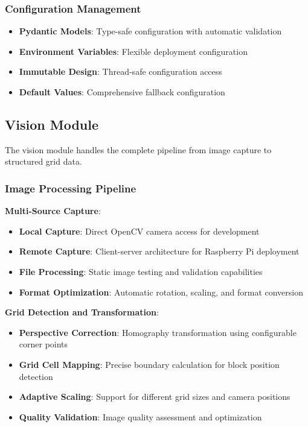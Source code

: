 \subsubsection{Configuration Management}
\begin{itemize}
    \item \textbf{Pydantic Models}: Type-safe configuration with automatic validation
    \item \textbf{Environment Variables}: Flexible deployment configuration
    \item \textbf{Immutable Design}: Thread-safe configuration access
    \item \textbf{Default Values}: Comprehensive fallback configuration
\end{itemize}

\subsection{Vision Module}

The vision module handles the complete pipeline from image capture to structured grid data.

\subsubsection{Image Processing Pipeline}
\textbf{Multi-Source Capture}:
\begin{itemize}
    \item \textbf{Local Capture}: Direct OpenCV camera access for development
    \item \textbf{Remote Capture}: Client-server architecture for Raspberry Pi deployment
    \item \textbf{File Processing}: Static image testing and validation capabilities
    \item \textbf{Format Optimization}: Automatic rotation, scaling, and format conversion
\end{itemize}

\textbf{Grid Detection and Transformation}:
\begin{itemize}
    \item \textbf{Perspective Correction}: Homography transformation using configurable corner points
    \item \textbf{Grid Cell Mapping}: Precise boundary calculation for block position detection
    \item \textbf{Adaptive Scaling}: Support for different grid sizes and camera positions
    \item \textbf{Quality Validation}: Image quality assessment and optimization
\end{itemize}

